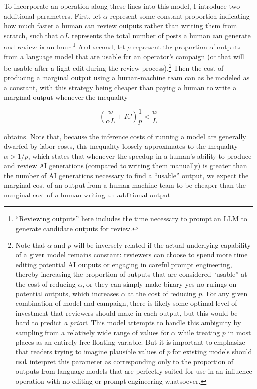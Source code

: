 \documentclass{article}
\begin{document}
To incorporate an operation along these lines into this model, I introduce two additional parameters. First, let $\alpha$ represent some constant proportion indicating how much faster a human can review outputs rather than writing them from scratch, such that $\alpha L$ represents the total number of posts a human can generate and review in an hour.\footnote{``Reviewing outputs'' here includes the time necessary to prompt an LLM to generate candidate outputs for review.} And second, let $p$ represent the proportion of outputs from a language model that are usable for an operator's campaign (or that will be usable after a light edit during the review process).\footnote{Note that $\alpha$ and $p$ will be inversely related if the actual underlying capability of a given model remains constant: reviewers can choose to spend more time editing potential AI outputs or engaging in careful prompt engineering, thereby increasing the proportion of outputs that are considered ``usable'' at the cost of reducing $\alpha$, or they can simply make binary yes-no rulings on potential outputs, which increases $\alpha$ at the cost of reducing $p$. For any given combination of model and campaign, there is likely some optimal level of investment that reviewers should make in each output, but this would be hard to predict \textit{a priori}. This model attempts to handle this ambiguity by sampling from a relatively wide range of values for $\alpha$ while treating $p$ in most places as an entirely free-floating variable. But it is important to emphasize that readers trying to imagine plausible values of $p$ for existing models should \textbf{not} interpret this parameter as corresponding only to the proportion of outputs from language models that are perfectly suited for use in an influence operation with no editing or prompt engineering whatsoever.} Then the cost of producing a marginal output using a human-machine team can as be modeled as a constant, with this strategy being cheaper than paying a human to write a marginal output whenever the inequality 

\begin{equation}
  \left( \frac{w}{\alpha L} + IC \right) \frac{1}{p} < \frac{w}{L}
  \label{eq:inequality}
\end{equation}

obtains. Note that, because the inference costs of running a model are generally dwarfed by labor costs, this inequality loosely approximates to the inequality $\alpha > 1/p$, which states that whenever the speedup in a human's ability to produce and review AI generations (compared to writing them manually) is greater than the number of AI generations necessary to find a ``usable'' output, we expect the marginal cost of an output from a human-machine team to be cheaper than the marginal cost of a human writing an additional output. 
\end{document}
